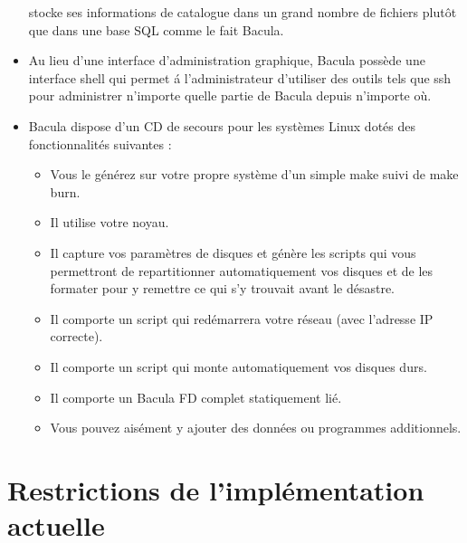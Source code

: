 \begin{itemize}
   stocke  ses informations de catalogue dans un grand nombre de fichiers 
   plut\^ot que dans une base SQL comme le fait Bacula. 
\item Au lieu d'une interface d'administration graphique, Bacula poss\`ede une 
   interface shell qui permet \'a l'administrateur d'utiliser des outils tels que 
   ssh pour administrer n'importe quelle partie de Bacula depuis n'importe o\`u.
\item Bacula dispose d'un CD de secours pour les syst\`emes Linux dot\'es des 
   fonctionnalit\'es suivantes :
   \begin{itemize}
   \item Vous le g\'en\'erez sur votre propre syst\`eme d'un simple make suivi de make burn. 
   \item Il utilise votre noyau.
   \item Il capture vos param\`etres de disques et g\'en\`ere les scripts qui vous permettront 
   de repartitionner automatiquement vos disques et de les formater pour y remettre 
   ce qui s'y trouvait avant le d\'esastre.
   \item Il comporte un script qui red\'emarrera votre r\'eseau (avec l'adresse IP correcte).
   \item Il comporte un script qui monte automatiquement vos disques durs. 
   \item Il comporte un Bacula FD complet statiquement li\'e. 
   \item Vous pouvez ais\'ement y ajouter des donn\'ees ou programmes additionnels. 
\end{itemize}
\end{itemize}

\section{Restrictions de l'impl\'ementation actuelle}


